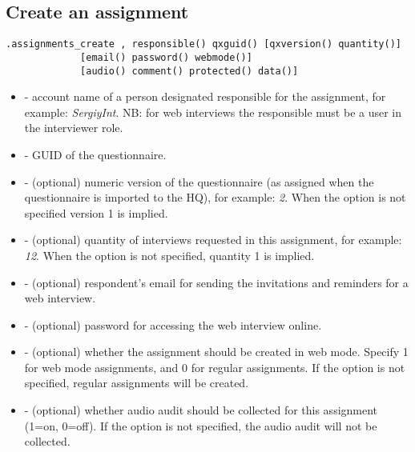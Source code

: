 \subsection{Create an assignment}

\begin{lstlisting}[style=CommandLineStyle]
.assignments_create , responsible() qxguid() [qxversion() quantity()]
             [email() password() webmode()]
             [audio() comment() protected() data()]
\end{lstlisting}

\optsheader
\begin{itemize}

\item {} - account name of a person designated responsible
for the assignment, for example: \textit{SergiyInt}. NB: for web interviews the
responsible must be a user in the interviewer role.

\item {} - GUID of the questionnaire.

\item {} - (optional) numeric version of the questionnaire
      (as assigned when the questionnaire is imported to the HQ), for example:
      \textit{2}. When the option is not specified version 1 is implied.

\item {} - (optional) quantity of interviews requested in
      this assignment, for example: \textit{12}. When the option is not
      specified, quantity 1 is implied.

\item {} - (optional) respondent's email for sending the
      invitations and reminders for a web interview.

\item {} - (optional) password for accessing the web interview
      online.

\item {} - (optional) whether the assignment should be
      created in web mode. Specify 1 for web mode assignments, and 0 for regular
      assignments. If the option is not specified, regular assignments will be
      created.

\item {} - (optional) whether audio audit should be collected for
      this assignment (1=on, 0=off). If the option is not specified, the audio
      audit will not be collected.


\end{itemize}
